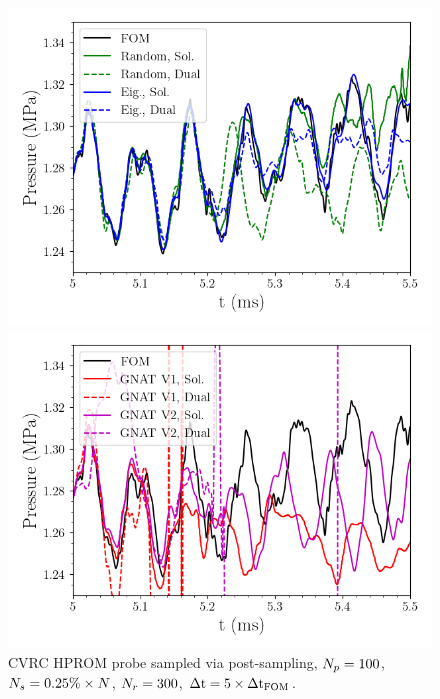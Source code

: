 \begin{figure}
	\begin{minipage}{0.49\linewidth}
		\includegraphics[width=0.99\linewidth]{Chapters/HPROMResults/Images/cvrc/dualModes/pressure_probe_deim_dual_random_eig_dt5e-7_samp0p0025.png}
	\end{minipage}
	\begin{minipage}{0.49\linewidth}
		\includegraphics[width=0.99\linewidth]{Chapters/HPROMResults/Images/cvrc/dualModes/pressure_probe_deim_dual_gnat_dt5e-7_samp0p0025.png}
	\end{minipage}
	\caption{\label{fig:cvrcSampledROMProbesDual}CVRC HPROM probe sampled via post-sampling, $N_p = 100$, $N_s = 0.25\% \times N$, $N_r = 300$, $\Delta \text{t} = 5 \times \Delta \text{t}_{\text{FOM}}$.}
\end{figure}

